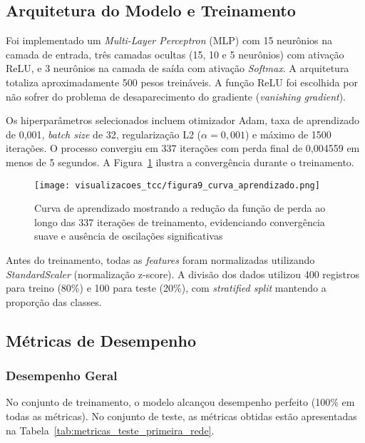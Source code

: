\subsection{Arquitetura do Modelo e Treinamento}

Foi implementado um \textit{Multi-Layer Perceptron} (MLP) com 15 neurônios na camada de entrada, três camadas ocultas (15, 10 e 5 neurônios) com ativação ReLU, e 3 neurônios na camada de saída com ativação \textit{Softmax}. A arquitetura totaliza aproximadamente 500 pesos treináveis. A função ReLU foi escolhida por não sofrer do problema de desaparecimento do gradiente (\textit{vanishing gradient}).

Os hiperparâmetros selecionados incluem otimizador Adam, taxa de aprendizado de 0,001, \textit{batch size} de 32, regularização L2 ($\alpha = 0,001$) e máximo de 1500 iterações. O processo convergiu em 337 iterações com perda final de 0,004559 em menos de 5 segundos. A Figura~\ref{fig:curva_aprendizado} ilustra a convergência durante o treinamento.

\begin{figure}[htbp]
    \centering
    \texttt{[image: visualizacoes\_tcc/figura9\_curva\_aprendizado.png]}
    \caption{Curva de aprendizado mostrando a redução da função de perda ao longo das 337 iterações de treinamento, evidenciando convergência suave e ausência de oscilações significativas}
    \label{fig:curva_aprendizado}
\end{figure}

Antes do treinamento, todas as \textit{features} foram normalizadas utilizando \textit{StandardScaler} (normalização z-score). A divisão dos dados utilizou 400 registros para treino (80\%) e 100 para teste (20\%), com \textit{stratified split} mantendo a proporção das classes.

\subsection{Métricas de Desempenho}

\subsubsection{Desempenho Geral}

No conjunto de treinamento, o modelo alcançou desempenho perfeito (100\% em todas as métricas). No conjunto de teste, as métricas obtidas estão apresentadas na Tabela~\ref{tab:metricas_teste_primeira_rede}.

